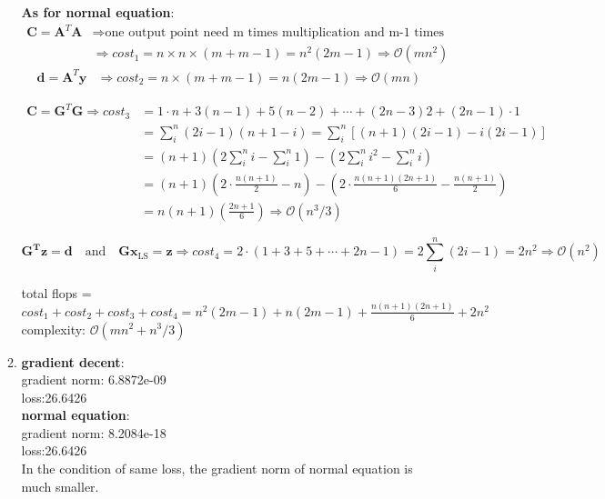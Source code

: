 \documentclass[english,onecolumn]{IEEEtran}
\begin{document}
\begin{enumerate}
\begin{enumerate}
        \textbf{As for normal equation}:\\
        \begin{align*}
            \mathbf{C}=\mathbf{A}^{T} \mathbf{A} & \Rightarrow \text{one output point need m times multiplication and m-1 times addition}  \\  & \Rightarrow cost_1 = n \times n \times (m+m-1) = n^2 (2m-1) \Rightarrow \mathcal{O} (m n^{2})
        \end{align*}
        \begin{align*}
            \mathbf{d}=\mathbf{A}^{T} \mathbf{y} & \Rightarrow cost_2 = n \times (m+m-1) = n (2m-1) \Rightarrow \mathcal{O}(m n)
        \end{align*}

        \begin{align*}
            \mathbf{C}=\mathbf{G}^{T} \mathbf{G} \Rightarrow
            cost_3 &= 1 \cdot n + 3(n-1) + 5(n-2) + \cdots +(2n-3)2+(2n-1) \cdot 1 \\
            & = \sum_i^n (2i-1)(n+1-i) = \sum_i^n [(n+1)(2i-1)-i(2i-1)]\\
            &= (n+1)(2\sum_i^n i -\sum_i^n 1) - (2\sum_i^n i^2 - \sum_i^n i)\\
            &= (n+1)(2\cdot \frac{n(n+1)}{2} - n) - (2 \cdot \frac{n(n+1)(2n+1)}{6} - \frac{n(n+1)}{2} )\\
            &=n(n+1)(\frac{2n+1}{6}) \Rightarrow \mathcal{O}\left(n^{3} / 3\right)
        \end{align*}
        
        $$\mathbf{G^{T} z}=\mathbf{d}\quad \text{and}\quad \mathbf{G} \mathbf{x}_{\mathrm{LS}}=\mathbf{z}  \Rightarrow  cost_4 = 2\cdot (1+3+5+\cdots +2n-1) = 2\sum_i^n (2i-1) = 2n^2 \Rightarrow \mathcal{O}\left(n^{2}\right) $$
        
        total flops = $cost_1+cost_2+cost_3+cost_4 = n^2(2m-1)+ n(2m-1)+\frac{n(n+1)(2n+1)}{6}+2n^2$\\
        complexity: $\mathcal{O}\left(m n^{2}+n^{3} / 3\right)$\\
        
        \item
        \textbf{gradient decent}:\\
        gradient norm: 6.8872e-09 \\
        loss:26.6426\\
        \textbf{normal equation}:\\
        gradient norm: 8.2084e-18 \\
        loss:26.6426\\
        
        In the condition of same loss, the gradient norm of normal equation is much smaller.


    \end{enumerate}
    
\end{enumerate}
\end{document}
